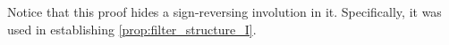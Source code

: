 \documentclass[submission]{FPSAC2023}
\theoremstyle{definition}
\newtheorem{thm}{Theorem}[section]
\newtheorem{defin}[thm]{Definition}
\newcommand{\III}{\vec{\mathbf{I}}}
\DeclareMathOperator{\pat}{\mathbf{pat}}
\begin{document}



Notice that this proof hides a sign-reversing involution in it.
Specifically, it was used in establishing \cref{prop:filter_structure_I}.

\end{document}
